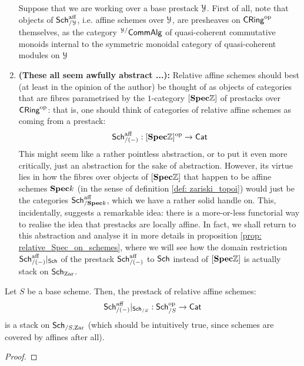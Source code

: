\begin{remark}
\begin{enumerate}
                            Suppose that we are working over a base prestack $\mathcal{Y}$. First of all, note that objects of $\mathsf{Sch}^{\mathrm{aff}}_{/\mathcal{Y}}$, i.e. affine schemes over $\mathcal{Y}$, are presheaves on $\mathsf{CRing}^{\mathrm{op}}$ themselves, as the category ${}^{\mathcal{Y}/}\mathsf{Comm}\mathsf{Alg}$ of quasi-coherent commutative monoids internal to the symmetric monoidal category of quasi-coherent modules on $\mathcal{Y}$
                            \item \textbf{(These all seem awfully abstract ...):} Relative affine schemes should best (at least in the opinion of the author) be thought of as objects of categories that are fibres parametrised by the $1$-category $[\mathbf{Spec} \mathbb{Z}]$ of prestacks over $\mathsf{CRing}^{\mathrm{op}}$: that is, one should think of categories of relative affine schemes as coming from a prestack:
                                $$\mathsf{Sch}^{\mathrm{aff}}_{/(-)}: [\mathbf{Spec} \mathbb{Z}]^{\mathrm{op}} \to \mathsf{Cat}$$
                            This might seem like a rather pointless abstraction, or to put it even more critically, just an abstraction for the sake of abstraction. However, its virtue lies in how the fibres over objects of $[\mathbf{Spec} \mathbb{Z}]$ that happen to be affine schemes $\mathbf{Spec} k$ (in the sense of definition \ref{def: zariski_topoi}) would just be the categories $\mathsf{Sch}^{\mathrm{aff}}_{/\mathbf{Spec} k}$, which we have a rather solid handle on. This, incidentally, suggests a remarkable idea: there is a more-or-less functorial way to realise the idea that prestacks are locally affine. In fact, we shall return to this abstraction and analyse it in more details in proposition \ref{prop: relative_Spec_on_schemes}, where we will see how the domain restriction $\mathsf{Sch}^{\mathrm{aff}}_{/(-)}|_{\mathsf{Sch}}$ of the prestack $\mathsf{Sch}^{\mathrm{aff}}_{/(-)}$ to $\mathsf{Sch}$ instead of $[\mathbf{Spec} \mathbb{Z}]$ is actually stack on $\mathsf{Sch}_{\mathrm{Zar}}$.
                        \end{enumerate}
                    \end{remark}
                    
                    \begin{proposition} \label{prop: relative_Spec_on_schemes}
                        Let $S$ be a base scheme. Then, the prestack of relative affine schemes:
                            $$\mathsf{Sch}^{\mathrm{aff}}_{/(-)}|_{\mathsf{Sch}_{/S}}: \mathsf{Sch}_{/S}^{\mathrm{op}} \to \mathsf{Cat}$$
                        is a stack on $\mathsf{Sch}_{/S, \mathrm{Zar}}$ (which should be intuitively true, since schemes are covered by affines after all).
                    \end{proposition}
                        \begin{proof}
                            
                        \end{proof}
                
